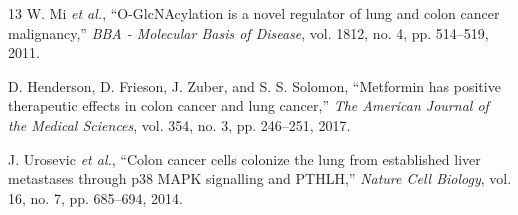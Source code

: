 \documentclass{ieeeaccess}
\begin{document}
\begin{thebibliography}{13}
W. Mi \emph{et al.},
``O-GlcNAcylation is a novel regulator of lung and colon cancer malignancy,''
\emph{BBA - Molecular Basis of Disease}, vol. 1812, no. 4, pp. 514--519, 2011.

D. Henderson, D. Frieson, J. Zuber, and S. S. Solomon,
``Metformin has positive therapeutic effects in colon cancer and lung cancer,''
\emph{The American Journal of the Medical Sciences}, vol. 354, no. 3, pp. 246--251, 2017.

J. Urosevic \emph{et al.},
``Colon cancer cells colonize the lung from established liver metastases through p38 MAPK signalling and PTHLH,''
\emph{Nature Cell Biology}, vol. 16, no. 7, pp. 685--694, 2014.

\end{thebibliography}
\end{document}
